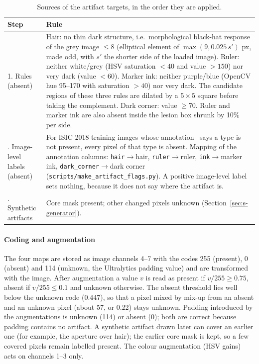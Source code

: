\documentclass[10pt,a4paper]{article}
\begin{document}
\begin{table}[H]
\centering
\caption{Sources of the artifact targets, in the order they are applied.}
\label{tab:s-labels}
\footnotesize
\begin{tabularx}{\textwidth}{@{}l>{\raggedright\arraybackslash}X@{}}
\toprule
Step & Rule \\
\midrule
1. Rules (absent) &
Hair: no thin dark structure, i.e.\ morphological black-hat response of the grey image $\le8$ (elliptical element of $\max(9,0.025\,s')$ px, made odd, with $s'$ the shorter side of the loaded image). Ruler: neither white/grey (HSV saturation $<40$ and value $>150$) nor very dark (value $<60$). Marker ink: neither purple/blue (OpenCV hue 95--170 with saturation $>40$) nor very dark. The candidate regions of these three rules are dilated by a $5\times5$ square before taking the complement. Dark corner: value $\ge70$. Ruler and marker ink are also absent inside the lesion box shrunk by 10\% per side. \\
\addlinespace
2. Image-level labels (absent) &
For ISIC 2018 training images whose annotation~\cite{bissoto2020debiasing} says a type is not present, every pixel of that type is absent. Mapping of the annotation columns: \texttt{hair}$\to$hair, \texttt{ruler}$\to$ruler, \texttt{ink}$\to$marker ink, \texttt{dark\_corner}$\to$dark corner (\texttt{scripts/make\_artifact\_flags.py}). A positive image-level label sets nothing, because it does not say where the artifact is. \\
\addlinespace
3. Synthetic artifacts &
Core mask present; other changed pixels unknown (Section~\ref{sec:s-generator}). \\
\bottomrule
\end{tabularx}
\end{table}

\paragraph{Coding and augmentation}
The four maps are stored as image channels 4--7 with the codes 255 (present), 0 (absent) and 114 (unknown, the Ultralytics padding value) and are transformed with the image. After augmentation a value $v$ is read as present if $v/255\ge0.75$, absent if $v/255\le0.1$ and unknown otherwise. The absent threshold lies well below the unknown code (0.447), so that a pixel mixed by mix-up from an absent and an unknown pixel (about 57, or 0.22) stays unknown. Padding introduced by the augmentations is unknown (114) or absent (0); both are correct because padding contains no artifact. A synthetic artifact drawn later can cover an earlier one (for example, the aperture over hair); the earlier core mask is kept, so a few covered pixels remain labelled present. The colour augmentation (HSV gains) acts on channels 1--3 only.
\end{document}
